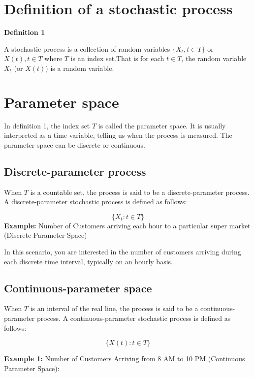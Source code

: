 \documentclass[
  letterpaper,
  DIV=11,
  numbers=noendperiod]{scrreprt}
\begin{document}
\section{Definition of a stochastic
process}\label{definition-of-a-stochastic-process}

\textbf{Definition 1}

A stochastic process is a collection of random variables
\(\{X_t, t\in T\}\) or \({X(t), t \in T}\) where \(T\) is an index
set.That is for each \(t \in T\), the random variable \(X_t\) (or
\(X(t)\)) is a random variable.

\section{Parameter space}\label{parameter-space}

In definition 1, the index set \(T\) is called the parameter space. It
is usually interpreted as a time variable, telling us when the process
is measured. The parameter space can be discrete or continuous.

\subsection{Discrete-parameter
process}\label{discrete-parameter-process}

When \(T\) is a countable set, the process is said to be a
discrete-parameter process. A discrete-parameter stochastic process is
defined as follows:

\[\{X_t: t \in T\}\] \textbf{Example:} Number of Customers arriving each
hour to a particular super market (Discrete Parameter Space)

In this scenario, you are interested in the number of customers arriving
during each discrete time interval, typically on an hourly basis.

\subsection{Continuous-parameter
space}\label{continuous-parameter-space}

When \(T\) is an interval of the real line, the process is said to be a
continuous-parameter process. A continuous-parameter stochastic process
is defined as follows:

\[\{X(t): t \in T\}\]

\textbf{Example 1:} Number of Customers Arriving from 8 AM to 10 PM
(Continuous Parameter Space):
\end{document}
